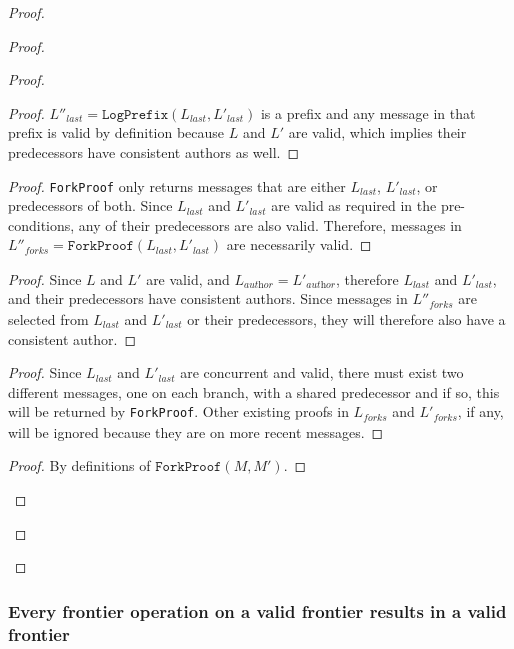 \documentclass[9pt, oneside]{article}   	%
\begin{document}
\begin{proof}
\begin{proof}
\begin{proof}
			\begin{proof}
					$L''_\textit{last} = \texttt{LogPrefix}(L_\textit{last},L'_\textit{last})$ is a prefix and any message in that prefix is valid by definition because $L$ and $L'$ are valid, which implies their predecessors have consistent authors as well.
			\end{proof} 
			
			\begin{proof}
				\texttt{ForkProof} only returns messages that are either $L_\textit{last}$, $L'_\textit{last}$, or predecessors of both. Since $L_\textit{last}$ and $L'_\textit{last}$ are valid as required in the pre-conditions, any of their predecessors are also valid. Therefore, messages in $L''_\textit{forks} = \texttt{ForkProof}(L_\textit{last}, L'_\textit{last})$ are necessarily valid.
			\end{proof}
			
			\begin{proof}
				Since $L$ and $L'$ are valid, and $L_\textit{author}=L'_\textit{author}$, therefore $L_\textit{last}$ and $L'_\textit{last}$, and their predecessors have consistent authors. Since messages in $L''_\textit{forks}$ are selected from  $L_\textit{last}$ and $L'_\textit{last}$ or their predecessors, they will therefore also have a consistent author.
			\end{proof}
			
			\begin{proof}
			Since $L_\textit{last}$ and $L'_\textit{last}$ are concurrent and valid, there must exist two different messages, one on each branch, with a shared predecessor and if so, this will be returned by \texttt{ForkProof}. Other existing proofs in $L_\textit{forks}$ and $L'_\textit{forks}$, if any, will be ignored because they are on more recent messages.
			\end{proof}
			
			\begin{proof}
				By definitions of $\texttt{ForkProof}(M,M')$.
			\end{proof}
		\end{proof}
	

	\end{proof}
\end{proof}

\subsubsection{Every frontier operation on a valid frontier results in a valid frontier}
\label{sec:proofs:valid-frontier}
\end{document}
